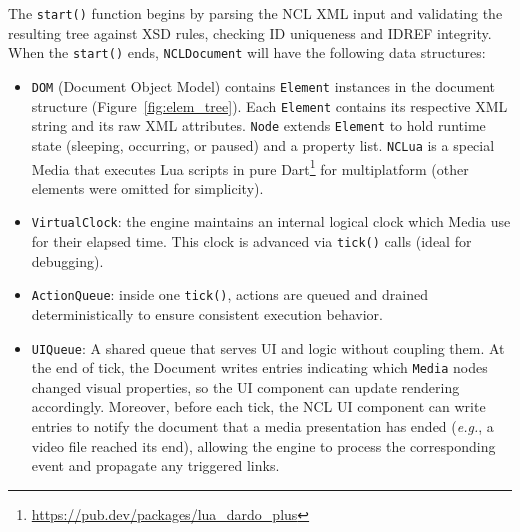 \documentclass[sigconf]{webmedia}
\begin{document}
The \texttt{start()} function begins by parsing the NCL XML input and validating the resulting tree against XSD rules, checking ID uniqueness and IDREF integrity. When the \texttt{start()} ends, \texttt{NCLDocument} will have the following data structures:
\begin{itemize}
  \item \texttt{DOM} (Document Object Model) contains \texttt{Element} instances in the document structure (Figure~\ref{fig:elem_tree}). Each \texttt{Element} contains its respective XML string and its raw XML attributes. \texttt{Node} extends \texttt{Element} to hold runtime state (sleeping, occurring, or paused) and a property list. \texttt{NCLua} is a special Media that executes Lua scripts in pure Dart\footnote{\url{https://pub.dev/packages/lua_dardo_plus}} for multiplatform (other elements were omitted for simplicity).
  \item \texttt{VirtualClock}: the engine maintains an internal logical clock which Media use for their elapsed time. This clock is advanced via \texttt{tick()} calls (ideal for debugging).
  \item \texttt{ActionQueue}: inside one \texttt{tick()}, actions are queued and drained deterministically to ensure consistent execution behavior.
  \item \texttt{UIQueue}: A shared queue that serves UI and logic without coupling them. At the end of tick, the Document writes entries indicating which \texttt{Media} nodes changed visual properties, so the UI component can update rendering accordingly. Moreover, before each tick, the NCL UI component can write entries to notify the document that a media presentation has ended (\textit{e.g.}, a video file reached its end), allowing the engine to process the corresponding event and propagate any triggered links.
\end{itemize}
\end{document}
